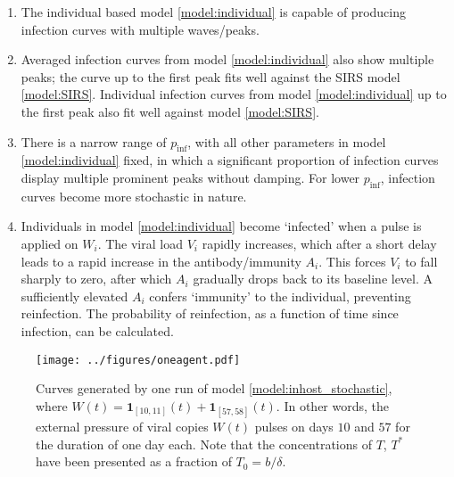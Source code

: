 \documentclass[11pt]{article}
\numberwithin{equation}{subsection}
\begin{document}
    \begin{enumerate}
        \item The individual based model \ref{model:individual} is capable of
        producing infection curves with multiple waves/peaks.

        \item Averaged infection curves from model \ref{model:individual} also
        show multiple peaks; the curve up to the first peak fits well against
        the SIRS model \ref{model:SIRS}. Individual infection curves from
        model \ref{model:individual} up to the first peak also fit well
        against model \ref{model:SIRS}.

        \item There is a narrow range of $p_\text{inf}$, with all other
        parameters in model \ref{model:individual} fixed, in which a
        significant proportion of infection curves display multiple prominent
        peaks without damping. For lower $p_\text{inf}$, infection curves
        become more stochastic in nature.

        \item Individuals in model \ref{model:individual} become `infected'
        when a pulse is applied on $W_i$. The viral load $V_i$ rapidly
        increases, which after a short delay leads to a rapid increase in the
        antibody/immunity $A_i$. This forces $V_i$ to fall sharply to zero,
        after which $A_i$ gradually drops back to its baseline level. A
        sufficiently elevated $A_i$ confers `immunity' to the individual,
        preventing reinfection.  The probability of reinfection, as a function
        of time since infection, can be calculated.
    \end{enumerate}


    \begin{figure}[h!]
    \begin{center}
        \texttt{[image: ../figures/oneagent.pdf]}
    \end{center}
    \caption{
        Curves generated by one run of model \ref{model:inhost_stochastic},
        where $W(t) = \mathbf{1}_{[10, 11]}(t) + \mathbf{1}_{[57, 58]}(t)$. In
        other words, the external pressure of viral copies $W(t)$ pulses on
        days $10$ and $57$ for the duration of one day each. Note that the
        concentrations of $T$, $T^*$ have been presented as a fraction of $T_0
        = b / \delta$.
    }
    \label{fig:oneagent}
    \end{figure}
\end{document}
